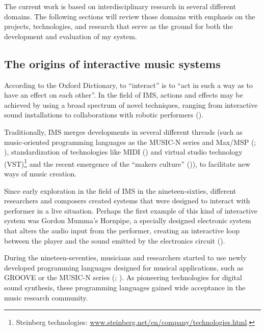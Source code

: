 \documentclass[a4paper,11pt]{article}
\begin{document}
The current work is based on interdisciplinary research in several different domains.
The following sections will review those domains with emphasis on the projects, technologies, and research that serve as the ground for both the development and evaluation of my system.

\subsection{The origins of interactive music systems}

According to the Oxford Dictionary, to ``interact'' is to ``act in such a way as to have an effect on each other''.
In the field of IMS, actions and effects may be achieved by using a broad spectrum of novel techniques, ranging from interactive sound installations to collaborations with robotic performers (\cite{drummond09}).

Traditionally, IMS merges developments in several different threads (such as music-oriented programming languages as the MUSIC-N series and Max/MSP (\cite{mathews69}; \cite[p. 16]{winkler01}), standardization of technologies like MIDI (\cite{web:quinn}) and virtual studio technology (VST)\footnote{Steinberg technologies: \href{http://www.steinberg.net/en/company/technologies.html}{www.steinberg.net/en/company/technologies.html}.} and the recent emergence of the ``makers culture'' (\cite{kuznetsov2010rise})), to facilitate new ways of music creation.

Since early exploration in the field of IMS in the nineteen-sixties, different researchers and composers created systems that were designed to interact with performer in a live situation.
Perhaps the first example of this kind of interactive system was Gordon Mumma's Hornpipe, a specially designed electronic system that alters the audio input from the performer, creating an interactive loop between the player and the sound emitted by the electronics circuit (\cite[p. 12]{winkler01}).

During the nineteen-seventies, musicians and researchers started to use newly developed programming languages designed for musical applications, such as GROOVE or the MUSIC-N series (\cite{mathews70}; \cite{mathews69}).
As pioneering technologies for digital sound synthesis, these programming languages gained wide acceptance in the music research community.
\end{document}
